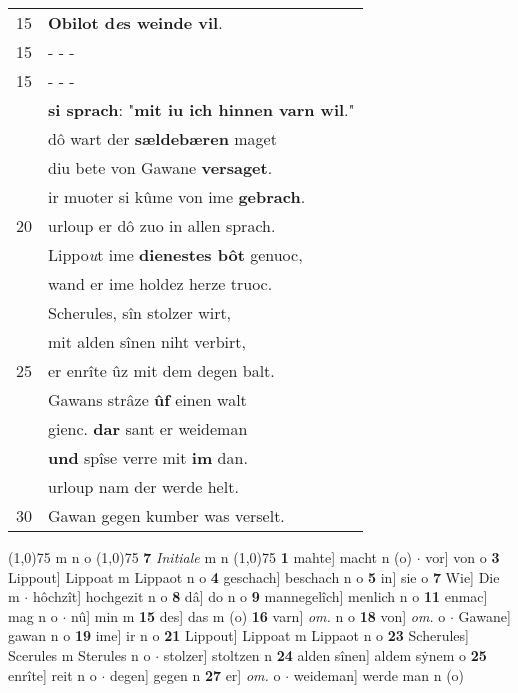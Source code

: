 \documentclass[8pt,a4paper,notitlepage]{article}
\begin{document}
\begin{table}[ht]
\begin{minipage}[t]{0.5\linewidth}
\begin{tabular}{rl}
15 & \textbf{Obilot d\textit{e}s weinde vil}.\\ 
15 & \multicolumn{1}{l}{ - - - }\\ 
15 & \multicolumn{1}{l}{ - - - }\\ 
 & \textbf{si sprach}: "\textbf{mit iu ich hinnen varn wil}."\\ 
 & dô wart der \textbf{sældebæren} maget\\ 
 & diu bete von Gawane \textbf{versaget}.\\ 
 & ir muoter si kûme von ime \textbf{gebrach}.\\ 
20 & urloup er dô zuo in allen sprach.\\ 
 & Lippo\textit{u}t ime \textbf{dienestes bôt} genuoc,\\ 
 & wand er ime holdez herze truoc.\\ 
 & Scherules, sîn stolzer wirt,\\ 
 & mit alden sînen niht verbirt,\\ 
25 & er enrîte ûz mit dem degen balt.\\ 
 & Gawans strâze \textbf{ûf} einen walt\\ 
 & gienc. \textbf{dar} sant er weideman\\ 
 & \textbf{und} spîse verre mit \textbf{im} dan.\\ 
 & urloup nam der werde helt.\\ 
30 & Gawan gegen kumber was verselt.\\ 
\end{tabular}
\scriptsize
\line(1,0){75} \newline
m n o \newline
\line(1,0){75} \newline
\textbf{7} \textit{Initiale} m n  \newline
\line(1,0){75} \newline
\textbf{1} mahte] macht n (o)  $\cdot$ vor] von o \textbf{3} Lippout] Lippoat m Lippaot n o \textbf{4} geschach] beschach n o \textbf{5} in] sie o \textbf{7} Wie] Die m  $\cdot$ hôchzît] hochgezit n o \textbf{8} dâ] do n o \textbf{9} mannegelîch] menlich n o \textbf{11} enmac] mag n o  $\cdot$ nû] min m \textbf{15} des] das m (o) \textbf{16} varn] \textit{om.} n o \textbf{18} von] \textit{om.} o  $\cdot$ Gawane] gawan n o \textbf{19} ime] ir n o \textbf{21} Lippout] Lippoat m Lippaot n o \textbf{23} Scherules] Scerules m Sterules n o  $\cdot$ stolzer] stoltzen n \textbf{24} alden sînen] aldem sẏnem o \textbf{25} enrîte] reit n o  $\cdot$ degen] gegen n \textbf{27} er] \textit{om.} o  $\cdot$ weideman] werde man n (o) \newline
\end{minipage}
\end{table}
\end{document}

